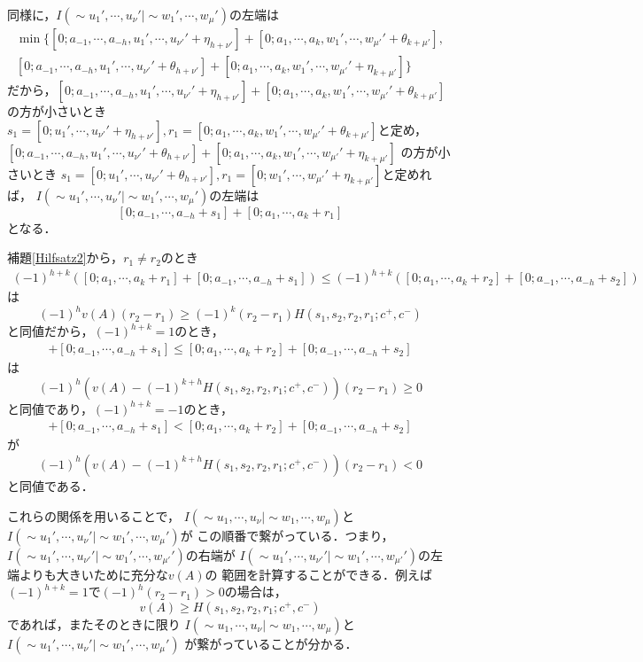\documentclass[10pt,a4paper]{ujarticle}
\theoremstyle{definition}
\begin{document}
同様に，$I(\sim u_1',\cdots, u_\nu'| \sim w_1',\cdots, w_\mu')$の左端は
\begin{align*}
  \min \{[0; a_{-1},\cdots , a_{-h}, u_1', \cdots, u_{\nu'}' + \eta_{h + \nu'}] + [0; a_1,\cdots , a_k, w_1', \cdots, w_{\mu'}' + \theta_{k + \mu'}],\\
  [0; a_{-1},\cdots , a_{-h}, u_1', \cdots, u_{\nu'}' + \theta_{h + \nu'}] + [0; a_1,\cdots , a_k, w_1', \cdots, w_{\mu'}' + \eta_{k + \mu'}] \}
\end{align*}
だから，$[0; a_{-1},\cdots , a_{-h}, u_1', \cdots, u_{\nu'}' + \eta_{h + \nu'}] + [0; a_1,\cdots , a_k, w_1', \cdots, w_{\mu'}' + \theta_{k + \mu'}]$
の方が小さいとき$s_1 = [0; u_1', \cdots, u_{\nu'}' + \eta_{h + \nu'}], r_1 = [0;a_1,\cdots , a_k, w_1', \cdots, w_{\mu'}' + \theta_{k + \mu'}]$と定め，
$[0; a_{-1},\cdots , a_{-h}, u_1', \cdots, u_{\nu'}' + \theta_{h + \nu'}] + [0; a_1,\cdots , a_k, w_1', \cdots, w_{\mu'}' + \eta_{k + \mu'}]$
の方が小さいとき
$s_1 = [0; u_1', \cdots, u_{\nu'}' + \theta_{h + \nu'}], r_1 = [0; w_1', \cdots, w_{\mu'}' + \eta_{k + \mu'}]$と定めれば，
$I(\sim u_1',\cdots, u_\nu'| \sim w_1',\cdots, w_\mu')$の左端は
\[
  [0; a_{-1},\cdots , a_{-h} + s_1] + [0; a_1,\cdots , a_{k} + r_1]
\]
となる．

補題\ref{Hilfsatz2}から，$r_1 \neq r_2$のとき
\begin{align*}
  (-1)^{h + k}([0; a_1,\cdots , a_{k} + r_1] +  [0; a_{-1},\cdots , a_{-h} + s_1])
  \le (-1)^{h + k}([0; a_1,\cdots , a_{k} + r_2] +  [0; a_{-1},\cdots , a_{-h} + s_2])
\end{align*}
は
\[
  (-1)^{h} v(A) (r_2 - r_1) \ge (-1)^k (r_2 - r_1) H(s_1, s_2, r_2, r_1; c^+ , c^-)
\]
と同値だから，$(-1)^{h + k} = 1$のとき，
\begin{align*}
  [0; a_1,\cdots , a_{k} + r_1] +  [0; a_{-1},\cdots , a_{-h} + s_1]
  \le [0; a_1,\cdots , a_{k} + r_2] +  [0; a_{-1},\cdots , a_{-h} + s_2]
\end{align*}
は
\[
  (-1)^{h} (v(A) - (-1)^{k + h}H(s_1, s_2, r_2, r_1; c^+ , c^-)) (r_2 - r_1) \ge 0 
\]
と同値であり，$(-1)^{h + k} = -1$のとき，
\begin{align*}
  [0; a_1,\cdots , a_{k} + r_1] +  [0; a_{-1},\cdots , a_{-h} + s_1]
  < [0; a_1,\cdots , a_{k} + r_2] +  [0; a_{-1},\cdots , a_{-h} + s_2]
\end{align*}
が
\[
  (-1)^{h} (v(A) - (-1)^{k + h}H(s_1, s_2, r_2, r_1; c^+ , c^-)) (r_2 - r_1) < 0 
\]
と同値である．

これらの関係を用いることで，
$I(\sim u_1,\cdots, u_\nu| \sim w_1,\cdots, w_\mu)$と$I(\sim u_1',\cdots, u_\nu'| \sim w_1',\cdots, w_\mu')$が
この順番で繋がっている．つまり，$I(\sim u_1',\cdots, u_{\nu'}'| \sim w_1',\cdots, w_{\mu'}')$の右端が
$I(\sim u_1',\cdots, u_{\nu'}'| \sim w_1',\cdots, w_{\mu'}')$の左端よりも大きいために充分な$v(A)$の
範囲を計算することができる．例えば$(-1)^{h + k} = 1$で$(-1)^h(r_2 - r_1)> 0$の場合は，
\[
v(A) \ge H(s_1, s_2, r_2, r_1; c^+ , c^-)
\]
であれば，またそのときに限り
$I(\sim u_1,\cdots, u_\nu| \sim w_1,\cdots, w_\mu)$と$I(\sim u_1',\cdots, u_\nu'| \sim w_1',\cdots, w_\mu')$
が繋がっていることが分かる．
\end{document}
